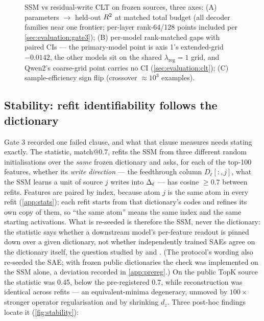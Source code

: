 \begin{figure}[t]
  \centering
  
  \caption{SSM vs residual-write CLT on frozen sources, three axes: (A)
  parameters $\to$ held-out $R^2$ at matched total budget (all decoder
  families near one frontier; per-layer rank-64/128 points included per
  \cref{sec:evaluation:gate3}); (B) per-model rank-matched gaps with paired
  CIs --- the primary-model point is axis 1's extended-grid $-0.0142$, the
  other models sit on the shared $\lambda_{\mathrm{reg}}{=}1$ grid, and
  Qwen2's coarse-grid point carries no CI
  (\cref{sec:evaluation:clt}); (C) sample-efficiency sign flip (crossover
  $\approx 10^3$ examples).
 }
  \label{fig:clt}
\end{figure}

\subsection{Stability: refit identifiability follows the dictionary}
\label{sec:evaluation:stability}

Gate 3 recorded one failed clause, and what that clause measures needs
stating exactly. The statistic, match@0.7, refits the SSM from three
different random initialisations over the \emph{same} frozen dictionary and
asks, for each of the top-100 features, whether its \emph{write direction}
--- the feedthrough column $D_\ell[:, j]$, what the SSM learns a unit of
source $j$ writes into $\Delta_\ell$ --- has cosine $\ge 0.7$ between refits.
Features are paired by index, because atom $j$ is the same atom in every
refit (\cref{app:stats}); each refit starts from that dictionary's codes
and refines its own copy of them, so ``the same atom'' means the same index
and the same starting activations. What is re-seeded is therefore the SSM, never the
dictionary: the statistic says whether a downstream model's per-feature
readout is pinned down over a given dictionary, not whether independently
trained SAEs agree on the dictionary itself, the question studied by
\citet{paulo2026seeds} and \citet{song2026consistency}. (The protocol's
wording also re-seeded the SAE; with frozen public dictionaries the check
was implemented on the SSM alone, a deviation recorded in
\cref{app:prereg}.) On the public TopK source the statistic was 0.45, below
the pre-registered 0.7, while reconstruction was identical across refits ---
an equivalent-minima degeneracy, unmoved
by $100\times$ stronger operator regularisation and by shrinking $d_z$. Three
post-hoc findings locate it (\cref{fig:stability}):


